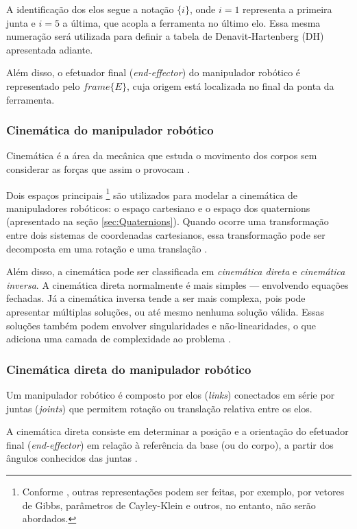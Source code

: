 A identificação dos elos segue a notação $\{i\}$, onde $i=1$ representa a primeira junta e $i=5$ a última, que acopla a ferramenta no último elo. Essa mesma numeração será utilizada para definir a tabela de Denavit-Hartenberg (DH) apresentada adiante.

Além disso, o efetuador final (\emph{end-effector}) do manipulador robótico é representado pelo $frame \{E\}$, cuja origem está localizada no final da ponta da ferramenta.

\subsubsection{Cinemática do manipulador robótico}
Cinemática é a área da mecânica que estuda o movimento dos corpos sem considerar as forças que assim o provocam \cite{craig2005}.  

Dois espaços principais
\footnote{Conforme \cite{kucuk2006robot}, outras representações podem ser feitas, por exemplo, por vetores de Gibbs, parâmetros de Cayley-Klein e outros, no entanto, não serão abordados.}
são utilizados para modelar a cinemática de manipuladores robóticos: o espaço cartesiano e o espaço dos quaternions (apresentado na seção \eqref{sec:Quaternions}). Quando ocorre uma transformação entre dois sistemas de coordenadas cartesianos, essa transformação pode ser decomposta em uma rotação e uma translação \cite{kucuk2006robot}.  

Além disso, a cinemática pode ser classificada em \emph{cinemática direta} e \emph{cinemática inversa}. A cinemática direta normalmente é mais simples — envolvendo equações fechadas. Já a cinemática inversa tende a ser mais complexa, pois pode apresentar múltiplas soluções, ou até mesmo nenhuma solução válida. Essas soluções também podem envolver singularidades e não-linearidades, o que adiciona uma camada de complexidade ao problema \cite{craig2005, kucuk2006robot}.

\subsubsection{Cinemática direta do manipulador robótico}
Um manipulador robótico é composto por elos (\emph{links}) conectados em série por juntas (\emph{joints}) que permitem rotação ou translação relativa entre os elos.  

A cinemática direta consiste em determinar a posição e a orientação do efetuador final (\emph{end-effector}) em relação à referência da base (ou do corpo), a partir dos ângulos conhecidos das juntas \cite{kucuk2006robot}.

